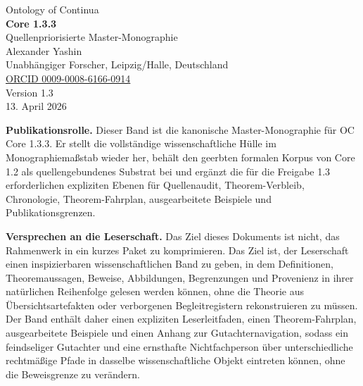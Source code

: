 \begin{titlepage}
\thispagestyle{empty}
\begin{center}
{\Large Ontology of Continua}\\[0.6cm]
{\huge \textbf{Core 1.3.3}}\\[0.3cm]
{\Large Quellenpriorisierte Master-Monographie}\\[1.2cm]

{\Large Alexander Yashin}\\[0.2cm]
{\normalsize Unabhängiger Forscher, Leipzig/Halle, Deutschland}\\[0.2cm]
{\normalsize \href{https://orcid.org/0009-0008-6166-0914}{ORCID 0009-0008-6166-0914}}\\[1.0cm]

{\normalsize Version 1.3}\\[0.2cm]
{\normalsize 13. April 2026}\\[1.2cm]

\begin{minipage}{0.88\textwidth}
\small
\textbf{Publikationsrolle.} Dieser Band ist die kanonische Master-Monographie für OC Core 1.3.3.
Er stellt die vollständige wissenschaftliche Hülle im Monographiemaßstab wieder her, behält den geerbten formalen Korpus von
Core 1.2 als quellengebundenes Substrat bei und ergänzt die für die
Freigabe 1.3 erforderlichen expliziten Ebenen für Quellenaudit, Theorem-Verbleib,
Chronologie, Theorem-Fahrplan, ausgearbeitete Beispiele und Publikationsgrenzen.

\medskip

\textbf{Versprechen an die Leserschaft.} Das Ziel dieses Dokuments ist nicht, das Rahmenwerk in ein
kurzes Paket zu komprimieren. Das Ziel ist, der Leserschaft einen inspizierbaren wissenschaftlichen Band zu geben, in dem
Definitionen, Theoremaussagen, Beweise, Abbildungen, Begrenzungen und Provenienz in
ihrer natürlichen Reihenfolge gelesen werden können, ohne die Theorie aus Übersichtsartefakten
oder verborgenen Begleitregistern rekonstruieren zu müssen. Der Band enthält daher einen
expliziten Leserleitfaden, einen Theorem-Fahrplan, ausgearbeitete Beispiele und einen Anhang zur
Gutachternavigation, sodass ein feindseliger Gutachter und eine ernsthafte Nichtfachperson
über unterschiedliche rechtmäßige Pfade in dasselbe wissenschaftliche Objekt eintreten können,
ohne die Beweisgrenze zu verändern.
\end{minipage}


\end{center}
\end{titlepage}
